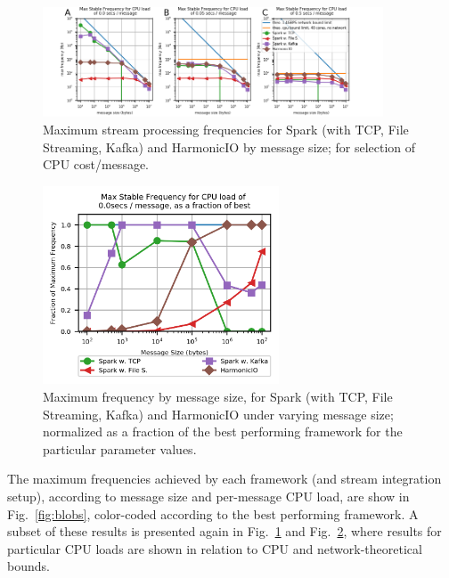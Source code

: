 \documentclass[conference]{IEEEtran}
\begin{document}
\begin{figure}[h]

\begin{center}
\includegraphics[width=0.9\textwidth]{images/selected_simple_plots.png}
\end{center}
\caption{Maximum stream processing frequencies for Spark (with TCP, File Streaming, Kafka) and HarmonicIO by message size; for selection of CPU cost/message.}
\label{fig:all-results}
\end{figure}

\begin{figure}[h]
\begin{center}
\includegraphics[width=7cm]{images/normalized_0.png}
\end{center}
\caption{Maximum frequency by message size, for Spark (with TCP, File Streaming, Kafka) and HarmonicIO under varying message size; normalized as a fraction of the best performing framework for the particular parameter values.}
\label{fig:result-normed}
\end{figure}


The maximum frequencies achieved by each framework (and stream integration setup), according to message size and per-message CPU load, are show in Fig.~\ref{fig:blobs}, color-coded according to the best performing framework. 
A subset of these results is presented again in Fig.~\ref{fig:all-results} and Fig.~\ref{fig:result-normed}, where results for particular CPU loads are shown in relation to CPU and network-theoretical bounds.
\end{document}
